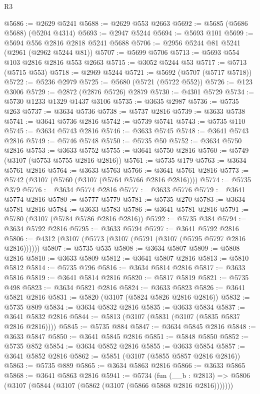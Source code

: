 \begin{lexlean}{R3}
\begin{coremodule}
@5686 := @2629 @5241
@5688 := @2629 @553 @2663
@5692 := @5685 (@5686 @5688) (@5204 @4314)
@5693 := @2947 @5244
@5694 := @5693 @101
@5699 := @5694 @556 @2816 @2818 @5241 @5688
@5706 := @2956 @5244 @81 @5241 (@2961 (@2962 @5244 @81))
@5707 := @5699 @5706
@5713 := @5693 @554 @103 @2816 @2816 @553 @2663
@5715 := @3052 @5244 @53
@5717 := @5713 (@5715 @553)
@5718 := @2969 @5244
@5721 := @5692 (@5707 (@5717 @5718))
@5722 := @5236 @2979
@5725 := @5680 (@5721 (@5722 @552))
@5726 := @123 @3006
@5729 := @2872 (@2876 @5726) @2879
@5730 := @4301 @5729
@5734 := @5730 @1233 @1329 @1437 @3106
@5735 := @3635 @2987
@5736 := @5735 @263
@5737 := @3634 @5736
@5738 := @5737 @2816
@5739 := @3633 @5738
@5741 := @3641 @5736 @2816
@5742 := @5739 @5741
@5743 := @5735 @110
@5745 := @3634 @5743 @2816
@5746 := @3633 @5745
@5748 := @3641 @5743 @2816
@5749 := @5746 @5748
@5750 := @5735 @50
@5752 := @3634 @5750 @2816
@5753 := @3633 @5752
@5755 := @3641 @5750 @2816
@5760 := @5749 (@3107 (@5753 @5755 @2816 @2816))
@5761 := @5735 @179
@5763 := @3634 @5761 @2816
@5764 := @3633 @5763
@5766 := @3641 @5761 @2816
@5773 := @5742 (@3107 (@5760 (@3107 (@5764 @5766 @2816 @2816))))
@5774 := @5735 @379
@5776 := @3634 @5774 @2816
@5777 := @3633 @5776
@5779 := @3641 @5774 @2816
@5780 := @5777 @5779
@5781 := @5735 @270
@5783 := @3634 @5781 @2816
@5784 := @3633 @5783
@5786 := @3641 @5781 @2816
@5791 := @5780 (@3107 (@5784 @5786 @2816 @2816))
@5792 := @5735 @384
@5794 := @3634 @5792 @2816
@5795 := @3633 @5794
@5797 := @3641 @5792 @2816
@5806 := @4312 (@3107 (@5773 (@3107 (@5791 (@3107 (@5795 @5797 @2816 @2816))))))
@5807 := @5735 @535
@5808 := @3634 @5807
@5809 := @5808 @2816
@5810 := @3633 @5809
@5812 := @3641 @5807 @2816
@5813 := @5810 @5812
@5814 := @5735 @796
@5816 := @3634 @5814 @2816
@5817 := @3633 @5816
@5819 := @3641 @5814 @2816
@5820 := @5817 @5819
@5821 := @5735 @498
@5823 := @3634 @5821 @2816
@5824 := @3633 @5823
@5826 := @3641 @5821 @2816
@5831 := @5820 (@3107 (@5824 @5826 @2816 @2816))
@5832 := @5735 @809
@5834 := @3634 @5832 @2816
@5835 := @3633 @5834
@5837 := @3641 @5832 @2816
@5844 := @5813 (@3107 (@5831 (@3107 (@5835 @5837 @2816 @2816))))
@5845 := @5735 @884
@5847 := @3634 @5845 @2816
@5848 := @3633 @5847
@5850 := @3641 @5845 @2816
@5851 := @5848 @5850
@5852 := @5735 @852
@5854 := @3634 @5852 @2816
@5855 := @3633 @5854
@5857 := @3641 @5852 @2816
@5862 := @5851 (@3107 (@5855 @5857 @2816 @2816))
@5863 := @5735 @889
@5865 := @3634 @5863 @2816
@5866 := @3633 @5865
@5868 := @3641 @5863 @2816
@5941 := @5734
    (fun (__b : @2813) => @5806 (@3107 (@5844 (@3107 (@5862 (@3107 (@5866 @5868 @2816 @2816)))))))

\end{coremodule}
\end{lexlean}
